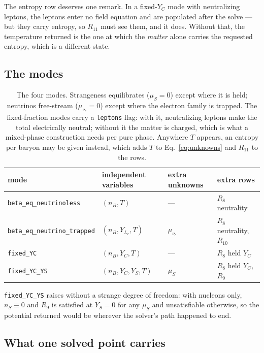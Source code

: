 \documentclass[aps,prc,onecolumn,superscriptaddress,nofootinbib,10pt]{revtex4-2}
\newcommand{\nB}{n_B}
\newcommand{\nS}{n_S}
\newcommand{\muS}{\mu_S}
\newcommand{\munue}{\mu_{\nu_e}}
\begin{document}
The entropy row deserves one remark. In a fixed-$Y_C$ mode with neutralizing
leptons, the leptons enter no field equation and are populated after the solve
--- but they carry entropy, so $R_{11}$ must see them, and it does. Without
that, the temperature returned is the one at which the \emph{matter} alone
carries the requested entropy, which is a different state.

\subsection{The modes}

\begin{table}[h]
\centering
\begin{tabular}{llll}
\toprule
mode & independent variables & extra unknowns & extra rows \\
\midrule
\texttt{beta\_eq\_neutrinoless} & $(\nB, T)$ & --- & $R_8$ neutrality \\
\texttt{beta\_eq\_neutrino\_trapped} & $(\nB, Y_{L_e}, T)$ & $\munue$
  & $R_8$ neutrality, $R_{10}$ \\
\texttt{fixed\_YC} & $(\nB, Y_C, T)$ & --- & $R_8$ held $Y_C$ \\
\texttt{fixed\_YC\_YS} & $(\nB, Y_C, Y_S, T)$ & $\muS$
  & $R_8$ held $Y_C$, $R_9$ \\
\bottomrule
\end{tabular}
\caption{The four modes. Strangeness equilibrates ($\muS = 0$) except where it
is held; neutrinos free-stream ($\munue = 0$) except where the electron family
is trapped. The fixed-fraction modes carry a \texttt{leptons} flag: with it,
neutralizing leptons make the total electrically neutral; without it the matter
is charged, which is what a mixed-phase construction needs per pure phase.
Anywhere $T$ appears, an entropy per baryon may be given instead, which adds
$T$ to Eq.~\eqref{eq:unknowns} and $R_{11}$ to the rows.}
\end{table}

\texttt{fixed\_YC\_YS} raises without a strange degree of freedom: with
nucleons only, $\nS \equiv 0$ and $R_9$ is satisfied at $Y_S = 0$ for any
$\muS$ and unsatisfiable otherwise, so the potential returned would be
wherever the solver's path happened to end.


\subsection{What one solved point carries}
\label{sec:returns}
\end{document}
